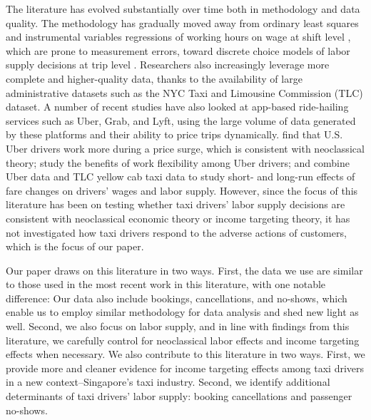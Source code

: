 \documentclass[reviewmode,AEJ]{AEA}
\begin{document}
The literature has evolved substantially over time  both in methodology and data quality.
The methodology has gradually moved away from ordinary least squares and instrumental variables
regressions of working hours on wage  at shift level \citep{camerer1997labor}, which are prone to
measurement errors, toward discrete choice models of labor supply decisions at trip level \citep{farber2005tomorrow,farber2015you,crawford2011new,martin2017quit}. Researchers also increasingly 
leverage more complete and higher-quality data, thanks to the availability of large administrative 
datasets such as the NYC Taxi and Limousine Commission (TLC) dataset. A number of recent studies
have also looked at app-based ride-hailing services such as Uber, Grab, and Lyft, using the large 
volume of data generated by these platforms and their ability to price trips dynamically. 
\citet{chen2015dynamic} find that U.S. Uber drivers work more during a price surge, 
which is consistent with neoclassical theory; \citet{chen2017value} study the benefits of 
work flexibility among Uber drivers; and \citet{hall2017labor} combine Uber data and TLC yellow
cab taxi data to study short- and long-run effects of fare changes on drivers' wages and labor supply. 
However, since the focus of this literature has been on testing whether taxi drivers' labor supply
decisions are consistent with neoclassical economic theory or income targeting theory, 
it has not investigated how taxi drivers respond to the adverse actions of customers, 
which is the focus of our paper.

Our paper draws on this literature in two ways. First, the data we use are similar to those used 
in the most recent work in this literature, with one notable difference: Our data also include bookings,
cancellations, and no-shows, which enable us to employ similar methodology for data analysis and 
shed new light as well. Second, we also focus on labor supply, and in line with findings from this
literature, we carefully control for neoclassical labor effects and income targeting effects when 
necessary. We also contribute to this literature in two ways. First, we provide more and cleaner
evidence for income targeting effects among taxi drivers in a new context--Singapore's taxi industry.
Second, we identify  additional determinants of taxi drivers' labor supply: booking cancellations and passenger no-shows.

\end{document}
